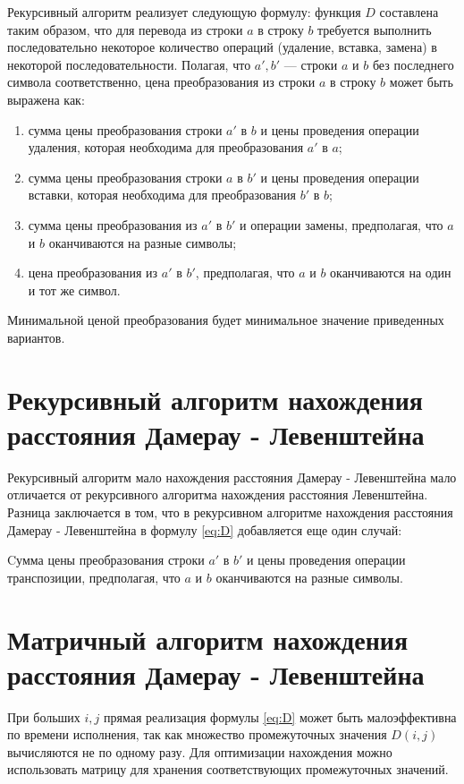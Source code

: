 Рекурсивный алгоритм реализует следующую формулу:
функция $D$ составлена таким образом, что для перевода из строки $a$ в строку $b$ требуется выполнить последовательно некоторое количество операций (удаление, вставка, замена) в некоторой последовательности. Полагая, что $a', b'$  — строки $a$ и $b$ без последнего символа соответственно, цена преобразования из строки $a$ в строку $b$ может быть выражена как:
\begin{enumerate}[label={\arabic*)}]
	\item сумма цены преобразования строки $a'$ в $b$ и цены проведения операции удаления, которая необходима для преобразования $a'$ в $a$;
	\item сумма цены преобразования строки $a$ в $b'$  и цены проведения операции вставки, которая необходима для преобразования $b'$ в $b$;
	\item сумма цены преобразования из $a'$ в $b'$ и операции замены, предполагая, что $a$ и $b$ оканчиваются на разные символы;
	\item цена преобразования из $a'$ в $b'$, предполагая, что $a$ и $b$ оканчиваются на один и тот же символ.
\end{enumerate}
Минимальной ценой преобразования будет минимальное значение приведенных вариантов.

\section{Рекурсивный алгоритм нахождения расстояния Дамерау - Левенштейна}

Рекурсивный алгоритм мало нахождения расстояния Дамерау - Левенштейна мало отличается от рекурсивного алгоритма нахождения расстояния Левенштейна. Разница заключается в том, что в рекурсивном алгоритме нахождения расстояния Дамерау - Левенштейна в формулу \ref{eq:D} добавляется еще один случай:

Cумма цены преобразования строки $a'$ в $b'$ и цены проведения операции транспозиции, предполагая, что $a$ и $b$ оканчиваются на разные символы.

\section{Матричный алгоритм нахождения расстояния Дамерау - Левенштейна}

При больших $i, j$ прямая реализация формулы \ref{eq:D} может быть малоэффективна по времени исполнения, так как множество промежуточных значения $ D(i, j)$ вычисляются не по одному разу. Для оптимизации нахождения можно использовать матрицу для хранения соответствующих промежуточных значений.

